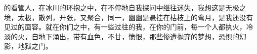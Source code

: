 \documentclass[UTF8]{article}
\begin{document}
的看管人，在冰川的环抱之中，在不停地自我探问中继往迷失，我想这是无极之境，太极，散列，开张，又聚合，同一，幽幽是悬挂在枯枝上的弯月，是我还没有见过的面容。就在你们之中，有一些过往的我，在你的门前，每一个人都执火，冷淡的火，自地下涌出，带有血色，不甘，愤恨，那些惨遭抛弃的梦想，恐惧的幻影，地狱之门。
\end{document}
